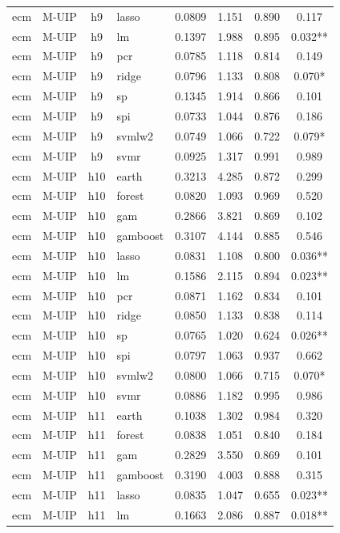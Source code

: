 \begin{ThreePartTable}
\begin{longtable}[t]{llclcccc}
ecm & M-UIP & h9 & lasso & 0.0809 & 1.151 & 0.890 & 0.117\\
ecm & M-UIP & h9 & lm & 0.1397 & 1.988 & 0.895 & 0.032**\\
ecm & M-UIP & h9 & pcr & 0.0785 & 1.118 & 0.814 & 0.149\\
ecm & M-UIP & h9 & ridge & 0.0796 & 1.133 & 0.808 & 0.070*\\
ecm & M-UIP & h9 & sp & 0.1345 & 1.914 & 0.866 & 0.101\\
ecm & M-UIP & h9 & spi & 0.0733 & 1.044 & 0.876 & 0.186\\
ecm & M-UIP & h9 & svmlw2 & 0.0749 & 1.066 & 0.722 & 0.079*\\
ecm & M-UIP & h9 & svmr & 0.0925 & 1.317 & 0.991 & 0.989\\
\addlinespace
ecm & M-UIP & h10 & earth & 0.3213 & 4.285 & 0.872 & 0.299\\
ecm & M-UIP & h10 & forest & 0.0820 & 1.093 & 0.969 & 0.520\\
ecm & M-UIP & h10 & gam & 0.2866 & 3.821 & 0.869 & 0.102\\
ecm & M-UIP & h10 & gamboost & 0.3107 & 4.144 & 0.885 & 0.546\\
ecm & M-UIP & h10 & lasso & 0.0831 & 1.108 & 0.800 & 0.036**\\
ecm & M-UIP & h10 & lm & 0.1586 & 2.115 & 0.894 & 0.023**\\
ecm & M-UIP & h10 & pcr & 0.0871 & 1.162 & 0.834 & 0.101\\
ecm & M-UIP & h10 & ridge & 0.0850 & 1.133 & 0.838 & 0.114\\
ecm & M-UIP & h10 & sp & 0.0765 & 1.020 & 0.624 & 0.026**\\
ecm & M-UIP & h10 & spi & 0.0797 & 1.063 & 0.937 & 0.662\\
ecm & M-UIP & h10 & svmlw2 & 0.0800 & 1.066 & 0.715 & 0.070*\\
ecm & M-UIP & h10 & svmr & 0.0886 & 1.182 & 0.995 & 0.986\\
\addlinespace
ecm & M-UIP & h11 & earth & 0.1038 & 1.302 & 0.984 & 0.320\\
ecm & M-UIP & h11 & forest & 0.0838 & 1.051 & 0.840 & 0.184\\
ecm & M-UIP & h11 & gam & 0.2829 & 3.550 & 0.869 & 0.101\\
ecm & M-UIP & h11 & gamboost & 0.3190 & 4.003 & 0.888 & 0.315\\
ecm & M-UIP & h11 & lasso & 0.0835 & 1.047 & 0.655 & 0.023**\\
ecm & M-UIP & h11 & lm & 0.1663 & 2.086 & 0.887 & 0.018**\\

\end{longtable}
\end{ThreePartTable}

